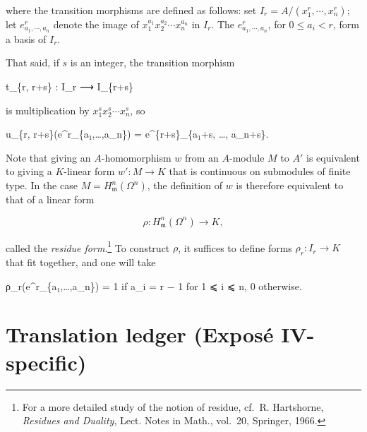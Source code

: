 \documentclass[
  11pt,
  a4paper,
]{book}
\newenvironment{Shaded}{}{}
\newcommand{\NormalTok}[1]{#1}
\begin{document}
where the transition morphisms are defined as follows: set
\(I_{r} = A/(x^{r}_{1}, \cdots, x^{r}_{n})\); let
\(e^{r}_{a_{1},\cdots,a_{n}}\) denote the image of
\(x^{a_{1}}_{1} x^{a_{2}}_{2} \cdots x^{a_{n}}_{n}\) in \(I_{r}\). The
\(e^{r}_{a_{1},\cdots,a_{n}}\), for \(0 \leqslant a_{i} < r\), form a
basis of \(I_{r}\).

That said, if \(s\) is an integer, the transition morphism

\begin{Shaded}
\begin{Highlighting}[]
\NormalTok{t\_\{r, r+s\} : I\_r ⟶ I\_\{r+s\}}
\end{Highlighting}
\end{Shaded}

is multiplication by \(x^{s}_{1} x^{s}_{2} \cdots x^{s}_{n}\), so

\begin{Shaded}
\begin{Highlighting}[]
\NormalTok{u\_\{r, r+s\}(e\^{}r\_\{a₁,…,a\_n\}) = e\^{}\{r+s\}\_\{a₁+s, …, a\_n+s\}.}
\end{Highlighting}
\end{Shaded}

Note that giving an \(A\)-homomorphism \(w\) from an \(A\)-module \(M\)
to \(A'\) is equivalent to giving a \(K\)-linear form \(w' :
M \to K\) that is continuous on submodules of finite type. In the case
\(M = H^{n}_{\mathfrak{m}}(\Omega^{n})\), the definition of \(w\) is
therefore equivalent to that of a linear form

\[ \rho : H^{n}_{\mathfrak{m}}(\Omega^{n}) \longrightarrow K, \]

called the \emph{residue form}.\footnote{For a more detailed study of
  the notion of residue, cf.~R. Hartshorne, \emph{Residues and Duality},
  Lect. Notes in Math., vol.~20, Springer, 1966.} To construct \(\rho\),
it suffices to define forms \(\rho_{r} : I_{r} \to K\) that fit
together, and one will take

\begin{Shaded}
\begin{Highlighting}[]
\NormalTok{ρ\_r(e\^{}r\_\{a₁,…,a\_n\}) =}
\NormalTok{    1   if a\_i = r − 1 for 1 ⩽ i ⩽ n,}
\NormalTok{    0   otherwise.}
\end{Highlighting}
\end{Shaded}

\section{Translation ledger (Exposé
IV-specific)}\label{translation-ledger-exposuxe9-iv-specific}
\end{document}
